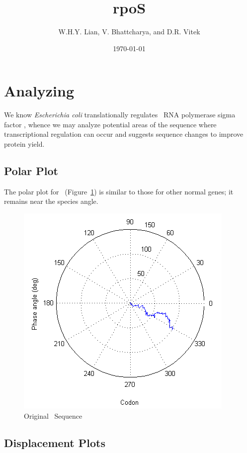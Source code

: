 \documentclass[10pt,twocolumn]{article}
\begin{document}
\title{{\bf rpoS}}
\author{{\sc W.H.Y. Lian, V. Bhattcharya, and D.R. Vitek}}
\date{{\sc \today}}
\maketitle

\section{Analyzing \rpoS}

We know {\it Escherichia coli} translationally regulates~\cite{rpos:process} RNA polymerase sigma factor \rpoS,
whence we may analyze potential areas of the sequence where transcriptional regulation can occur and
suggests sequence changes to improve protein yield.

\subsection{Polar Plot}

The polar plot for \rpoS\ (Figure~\ref{rpos:polar}) is similar to those for other normal genes; 
it remains near the species angle.

\begin{figure}[htp]
    \centering
    \caption{Original \rpoS\ Sequence}
    \label{rpos:polar}
    \includegraphics[scale=0.7]{rpoS/polar.png}
\end{figure}

\subsection{Displacement Plots}
\end{document}
